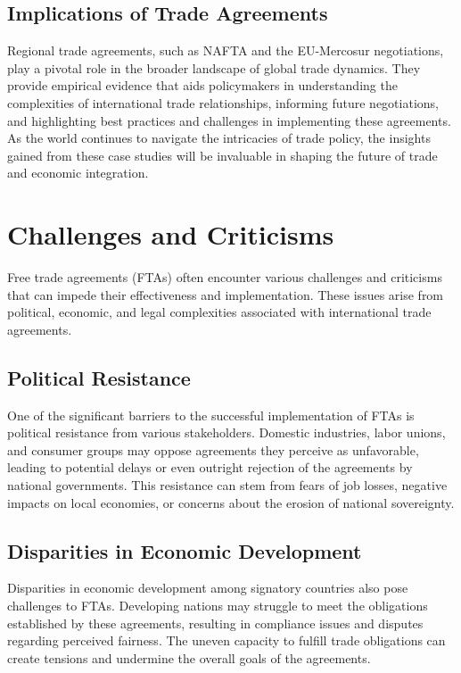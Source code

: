 \documentclass[12pt]{article}
\begin{document}
\subsection{Implications of Trade Agreements}
Regional trade agreements, such as NAFTA and the EU-Mercosur negotiations, play a pivotal role in the broader landscape of global trade dynamics. They provide empirical evidence that aids policymakers in understanding the complexities of international trade relationships, informing future negotiations, and highlighting best practices and challenges in implementing these agreements. As the world continues to navigate the intricacies of trade policy, the insights gained from these case studies will be invaluable in shaping the future of trade and economic integration.

\section{Challenges and Criticisms}
Free trade agreements (FTAs) often encounter various challenges and criticisms that can impede their effectiveness and implementation. These issues arise from political, economic, and legal complexities associated with international trade agreements.

\subsection{Political Resistance}
One of the significant barriers to the successful implementation of FTAs is political resistance from various stakeholders.  Domestic industries, labor unions, and consumer groups may oppose agreements they perceive as unfavorable, leading to potential delays or even outright rejection of the agreements by national governments. This resistance can stem from fears of job losses, negative impacts on local economies, or concerns about the erosion of national sovereignty.

\subsection{Disparities in Economic Development}
Disparities in economic development among signatory countries also pose challenges to FTAs. Developing nations may struggle to meet the obligations established by these agreements, resulting in compliance issues and disputes regarding perceived fairness. The uneven capacity to fulfill trade obligations can create tensions and undermine the overall goals of the agreements.
\end{document}
